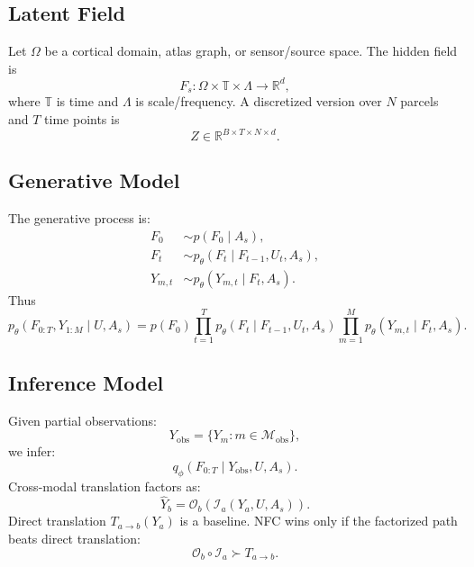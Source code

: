 \documentclass[11pt]{article}
\newcommand{\R}{\mathbb{R}}
\newcommand{\Obs}{\mathcal{O}}
\newcommand{\Infer}{\mathcal{I}}
\begin{document}
\subsection{Latent Field}

Let $\Omega$ be a cortical domain, atlas graph, or sensor/source space. The hidden field is
\begin{equation}
F_s:\Omega\times \mathbb{T}\times \Lambda \rightarrow \R^d,
\end{equation}
where $\mathbb{T}$ is time and $\Lambda$ is scale/frequency. A discretized version over $N$ parcels and $T$ time points is
\begin{equation}
Z \in \R^{B\times T\times N\times d}.
\end{equation}

\subsection{Generative Model}

The generative process is:
\begin{align}
F_0 &\sim p(F_0\mid A_s),\\
F_t &\sim p_\theta(F_t\mid F_{t-1},U_t,A_s),\\
Y_{m,t} &\sim p_\theta(Y_{m,t}\mid F_t,A_s).
\end{align}
Thus
\begin{equation}
p_\theta(F_{0:T},Y_{1:M}\mid U,A_s)=p(F_0)\prod_{t=1}^T p_\theta(F_t\mid F_{t-1},U_t,A_s)\prod_{m=1}^M p_\theta(Y_{m,t}\mid F_t,A_s).
\end{equation}

\subsection{Inference Model}

Given partial observations:
\begin{equation}
Y_{\mathrm{obs}} = \{Y_m: m\in \mathcal{M}_{\mathrm{obs}}\},
\end{equation}
we infer:
\begin{equation}
q_\phi(F_{0:T}\mid Y_{\mathrm{obs}},U,A_s).
\end{equation}
Cross-modal translation factors as:
\begin{equation}
\hat{Y}_b = \Obs_b\left(\Infer_a(Y_a,U,A_s)\right).
\end{equation}
Direct translation $T_{a\rightarrow b}(Y_a)$ is a baseline. NFC wins only if the factorized path beats direct translation:
\begin{equation}
\Obs_b\circ \Infer_a \succ T_{a\rightarrow b}.
\end{equation}
\end{document}
